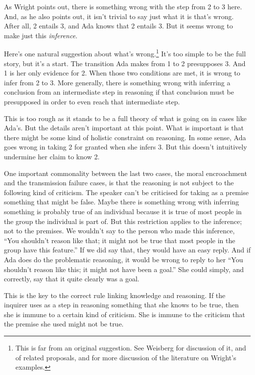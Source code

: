 \documentclass[
  11pt,
]{book}
\begin{document}
As Wright points out, there is something wrong with the step from 2 to 3 here. And, as he also points out, it isn't trivial to say just what it is that's wrong. After all, 2 entails 3, and Ada knows that 2 entails 3. But it seems wrong to make just this \emph{inference}.

Here's one natural suggestion about what's wrong.\footnote{This is far from an original suggestion. See Weisberg \citeyearpar{Weisberg2010} for discussion of it, and of related proposals, and for more discussion of the literature on Wright's examples.} It's too simple to be the full story, but it's a start. The transition Ada makes from 1 to 2 presupposes 3. And 1 is her only evidence for 2. When those two conditions are met, it is wrong to infer from 2 to 3. More generally, there is something wrong with inferring a conclusion from an intermediate step in reasoning if that conclusion must be presupposed in order to even reach that intermediate step.

This is too rough as it stands to be a full theory of what is going on in cases like Ada's. But the details aren't important at this point. What is important is that there might be some kind of holistic constraint on reasoning. In some sense, Ada goes wrong in taking 2 for granted when she infers 3. But this doesn't intuitively undermine her claim to know 2.

One important commonality between the last two cases, the moral encroachment and the transmission failure cases, is that the reasoning is not subject to the following kind of criticism. The speaker can't be criticised for taking as a premise something that might be false. Maybe there is something wrong with inferring something is probably true of an individual because it is true of most people in the group the individual is part of. But this restriction applies to the inference; not to the premises. We wouldn't say to the person who made this inference, ``You shouldn't reason like that; it might not be true that most people in the group have this feature.'' If we did say that, they would have an easy reply. And if Ada does do the problematic reasoning, it would be wrong to reply to her ``You shouldn't reason like this; it might not have been a goal.'' She could simply, and correctly, say that it quite clearly was a goal.

This is the key to the correct rule linking knowledge and reasoning. If the inquirer uses as a step in reasoning something that she knows to be true, then she is immune to a certain kind of criticism. She is immune to the criticism that the premise she used might not be true.
\end{document}
